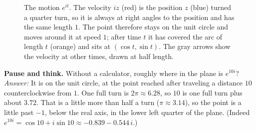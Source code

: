 \begin{figure}[htbp]
\centering
{}
\caption{The motion $e^{it}$. The velocity $iz$ (red) is the position $z$ (blue) turned a quarter turn, so it is always at right angles to the position and has the same length $1$. The point therefore stays on the unit circle and moves around it at speed $1$; after time $t$ it has covered the arc of length $t$ (orange) and sits at $(\cos t, \sin t)$. The gray arrows show the velocity at other times, drawn at half length.}
\label{ch30:fig-velocity-circle}
\end{figure}

\begin{recoverybox}
\textbf{Pause and think.} Without a calculator, roughly where in the plane is $e^{10i}$?
\\[0.4em]
\emph{Answer:} It is on the unit circle, at the point reached after traveling a distance $10$ counterclockwise from $1$. One full turn is $2\pi \approx 6.28$, so $10$ is one full turn plus about $3.72$. That is a little more than half a turn ($\pi \approx 3.14$), so the point is a little past $-1$, below the real axis, in the lower left quarter of the plane. (Indeed $e^{10i} = \cos 10 + i \sin 10 \approx -0.839 - 0.544\,i$.)
\end{recoverybox}

